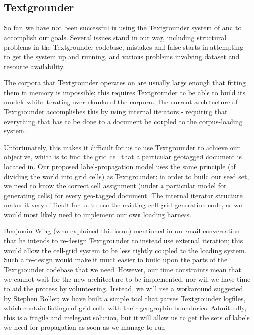 
\subsection{Textgrounder}
So far, we have not been successful in using the Textgrounder system of 
\cite{wing-baldridge:11} and \cite{rolleretal:12} to accomplish our goals. 
Several issues stand in our way, including structural problems in the
Textgrounder codebase, mistakes and false starts in attempting to get
the system up and running, and various problems involving dataset and resource
availability.
\par
The corpora that Textgrounder operates on are usually large enough that fitting them
in memory is impossible; this requires Textgrounder to be able to
build its models while iterating over chunks of the corpora.
The current architecture of Textgrounder accomplishes this by using internal
iterators - requiring that everything that has to be done to a document be
coupled to the corpus-loading system.
\par
Unfortunately, this makes it difficult for us to use Textgrounder to achieve
our objective, which is to find the grid cell that a particular geotagged document is located in.
Our proposed label-propagation model uses the same principle (of dividing the
world into grid cells) as Textgrounder; in order to build our seed set, we need to
know the correct cell assignment (under a particular model for generating
cells) for every geo-tagged document.
The internal iterator structure makes it very difficult for us to use the
existing cell grid generation code, as we would most likely need to implement our own
loading harness.
\par
Benjamin Wing (who explained this issue) mentioned in an email conversation that he intends to re-design
Textgrounder to instead use external iteration; this would allow the cell-grid
system to be less tightly coupled to the loading system.
Such a re-design would make it much easier to build upon the parts of the
Textgrounder codebase that we need. However, our time constraints mean that we cannot 
wait for the new architecture to be implemented, nor will we have
time to aid the process by volunteering.
Instead, we will use a workaround suggested by Stephen Roller; we have built a
simple tool that parses Textgrounder logfiles, which contain listings of grid
cells with their geographic boundaries.
Admittedly, this is a fragile and inelegant solution, but it will allow us to
get the sets of labels we need for propagation as soon as we manage to run
